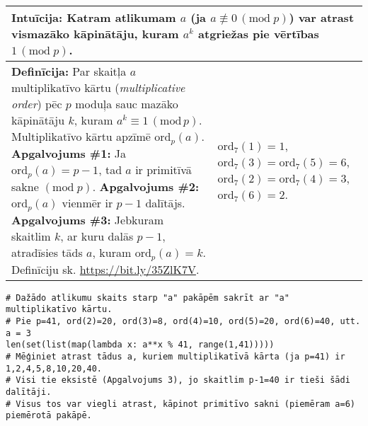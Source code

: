 \documentclass[a4paper]{article}
\begin{document}
\vspace{-10pt}
\renewcommand{\arraystretch}{1.2}
\begin{table}[ht!]\centering
{\small
\begin{tabular*}{18.46cm}{@{}|p{10.35cm}|p{7.25cm}|@{}} \hline
\multicolumn{2}{|p{18.05cm}|}{
\cellcolor[HTML]{E1FFE1}
Intuīcija: Katram atlikumam $a$ (ja $a \not\equiv 0\,(\text{mod}\;p)$) var atrast vismazāko kāpinātāju, 
kuram $a^k$ atgriežas pie vērtības $1\,(\text{mod}\;p)$.
} \\ \hline
{\bf Definīcija:} Par skaitļa $a$ multiplikatīvo kārtu ({\em multiplicative order}) 
pēc $p$ moduļa sauc mazāko kāpinātāju $k$, kuram $a^k \equiv 1\,(\text{mod}\,p)$.\newline
Multiplikatīvo kārtu apzīmē $\text{ord}_p(a)$.\newline
{\bf Apgalvojums \#1:} Ja $\text{ord}_p(a) = p-1$, tad $a$ ir primitīvā sakne $(\text{mod}\;p)$.\newline
{\bf Apgalvojums \#2:} $\text{ord}_p(a)$ vienmēr ir $p-1$ dalītājs.\newline
{\bf Apgalvojums \#3:} Jebkuram skaitlim $k$, ar kuru dalās $p-1$, atradīsies tāds $a$, kuram $\text{ord}_p(a) = k$.\newline
Definīciju sk. \url{https://bit.ly/35ZlK7V}.
 &
$\text{ord}_7(1) = 1$,\newline
$\text{ord}_7(3) = \text{ord}_7(5) = 6$,\newline
$\text{ord}_7(2) = \text{ord}_7(4) = 3$,\newline
$\text{ord}_7(6) = 2$.
\\ \hline
\end{tabular*}
}
\end{table}

{\small
\vspace{-10pt}
\begin{Verbatim}
# Dažādo atlikumu skaits starp "a" pakāpēm sakrīt ar "a" multiplikatīvo kārtu. 
# Pie p=41, ord(2)=20, ord(3)=8, ord(4)=10, ord(5)=20, ord(6)=40, utt.
a = 3
len(set(list(map(lambda x: a**x % 41, range(1,41)))))
# Mēģiniet atrast tādus a, kuriem multiplikatīvā kārta (ja p=41) ir 1,2,4,5,8,10,20,40. 
# Visi tie eksistē (Apgalvojums 3), jo skaitlim p-1=40 ir tieši šādi dalītāji.
# Visus tos var viegli atrast, kāpinot primitīvo sakni (piemēram a=6) piemērotā pakāpē.
\end{Verbatim}
}
\end{document}

